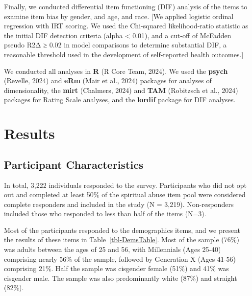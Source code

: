 \documentclass[
  letterpaper,
]{article}
\begin{document}
Finally, we conducted differential item functioning (DIF) analysis of
the items to examine item bias by gender, and age, and race. {[}We
applied logistic ordinal regression with IRT scoring. We used the
Chi-squared likelihood-ratio statistic as the initial DIF detection
criteria (alpha \textless{} 0.01), and a cut-off of McFadden pseudo R2Δ
≥ 0.02 in model comparisons to determine substantial DIF, a reasonable
threshold used in the development of self-reported health outcomes.{]}

We conducted all analyses in \textbf{R} (R Core Team, 2024). We used the
\textbf{psych} (Revelle, 2024) and \textbf{eRm} (Mair et al., 2024)
packages for analyses of dimensionality, the \textbf{mirt} (Chalmers,
2024) and \textbf{TAM} (Robitzsch et al., 2024) packages for Rating
Scale analyses, and the \textbf{lordif} package for DIF analyses.


\chapter*{Results}\label{results}


\section*{Participant
Characteristics}\label{participant-characteristics}


In total, 3,222 individuals responded to the survey. Participants who
did not opt out and completed at least 50\% of the spiritual abuse item
pool were considered complete responders and included in the study (N =
3,219). Non-responders included those who responded to less than half of
the items (N=3).

Most of the participants responded to the demographics items, and we
present the results of these items in Table~\ref{tbl-DemsTable}. Most of
the sample (76\%) was adults between the ages of 25 and 56, with
Millennials (Ages 25-40) comprising nearly 56\% of the sample, followed
by Generation X (Ages 41-56) comprising 21\%. Half the sample was
cisgender female (51\%) and 41\% was cisgender male. The sample was also
predominantly white (87\%) and straight (82\%).

\begingroup
\fontsize{12.0pt}{14.4pt}\selectfont
\setlength{\LTpost}{0mm}
\end{document}

